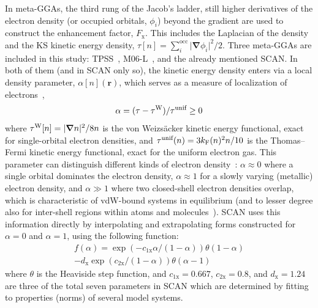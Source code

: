 In meta-GGAs, the third rung of the Jacob's ladder, still higher derivatives of the electron density (or occupied orbitals, $\phi_i$) beyond the gradient are used to construct the enhancement factor, $F_\mathrm x$.
This includes the Laplacian of the density and the KS kinetic energy density, $\tau[n]=\sum_i^\text{occ}\lvert\boldsymbol\nabla\phi_i\rvert^2/2$.
Three meta-GGAs are included in this study: TPSS~\cite{TaoPRL03}, M06-L~\cite{ZhaoTCA08}, and the already mentioned SCAN\@.
In both of them (and in SCAN only so), the kinetic energy density enters via a local density parameter, $\alpha[n](\mathbf r)$, which serves as a measure of localization of electrons~\cite{BeckeJCP90},
\begin{equation}
  \alpha=(\tau-\tau^\text W)/\tau^\text{unif}\geq0
\end{equation}
where $\tau^\text W[n]=\lvert\boldsymbol\nabla n\rvert^2/8n$ is the von Weizsäcker kinetic energy functional, exact for single-orbital electron densities, and $\tau^\text{unif}(n)=3k_\text F(n)^2n/10$ is the Thomas--Fermi kinetic energy functional, exact for the uniform electron gas.
This parameter can distinguish different kinds of electron density~\cite{SunPRL13}: $\alpha\approx0$ where a single orbital dominates the electron density, $\alpha\approx1$ for a slowly varying (metallic) electron density, and $\alpha\gg1$ where two closed-shell electron densities overlap, which is characteristic of vdW-bound systems in equilibrium (and to lesser degree also for inter-shell regions within atoms and molecules~\cite{BeckeJCP90}).
SCAN uses this information directly by interpolating and extrapolating forms constructed for $\alpha=0$ and $\alpha=1$, using the following function:
\begin{multline}
  f(\alpha)=\exp(-c_\mathrm{1x}\alpha/(1-\alpha))\theta(1-\alpha)\\
  -d_\mathrm x\exp(c_\mathrm{2x}/(1-\alpha))\theta(\alpha-1)
  \label{eq:scan-interp}
\end{multline}
where $\theta$ is the Heaviside step function, and $c_\mathrm{1x}=0.667$, $c_\mathrm{2x}=0.8$, and $d_\mathrm x=1.24$ are three of the total seven parameters in SCAN which are determined by fitting to properties (norms) of several model systems.

